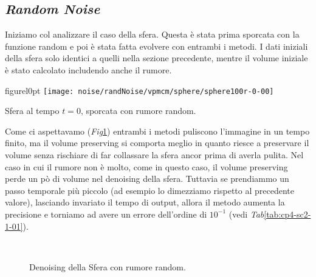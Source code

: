 %
\subsection{\emph{Random Noise}}
Iniziamo col analizzare il caso della sfera. Questa è stata prima
sporcata con la funzione random e poi è stata fatta evolvere con
entrambi i metodi.
I dati iniziali della sfera solo identici a quelli nella sezione
precedente, mentre il volume iniziale è stato calcolato includendo
anche il rumore.

\begin{wrapfloat}{figure}{l}{0pt}
\texttt{[image: noise/randNoise/vpmcm/sphere/sphere100r-0-00]}
\caption{Sfera al tempo $t=0$, sporcata con rumore random.}
\end{wrapfloat}

Come ci aspettavamo (\emph{Fig}\ref{fig:cp4-sc2-1-01}) entrambi i
metodi puliscono l'immagine in un tempo finito, ma il volume
preserving si comporta meglio in quanto riesce a preservare il volume
senza rischiare di far collassare la sfera ancor prima di averla
pulita. Nel caso in cui il rumore non è molto, come in questo caso, il
volume preserving perde un pò di volume nel denoising della sfera. 
Tuttavia se prendiammo un passo temporale più piccolo (ad esempio lo
dimezziamo rispetto al precedente valore), lasciando invariato il
tempo di output, allora il metodo aumenta la precisione e torniamo ad
avere un errore dell'ordine di $10^{-1}$ (vedi \emph{Tab}\ref{tab:cp4-sc2-1-01}).

\begin{figure}[htb!]
  \centering
  \quad
  \\
  \quad
  \quad
  \caption{Denoising della Sfera con rumore random.}
  \label{fig:cp4-sc2-1-01}
\end{figure}

